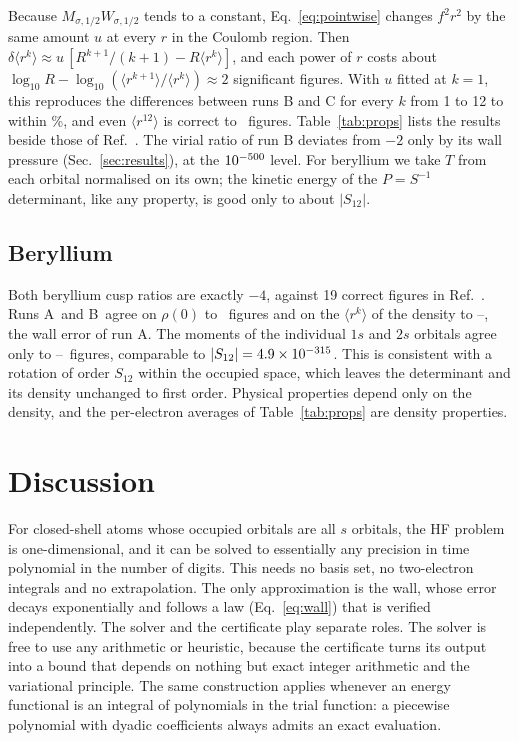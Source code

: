 \documentclass[aps,pra,reprint,superscriptaddress,amsmath,amssymb,longbibliography]{revtex4-2}
\begin{document}
Because $M_{\sigma,1/2}W_{\sigma,1/2}$ tends to a constant, Eq.~\eqref{eq:pointwise} changes $f^2r^2$ by the same amount $u$ at every $r$ in the Coulomb region. Then $\delta\langle r^k\rangle\approx u\,[R^{k+1}/(k+1)-R\langle r^k\rangle]$, and each power of $r$ costs about $\log_{10}R-\log_{10}(\langle r^{k+1}\rangle/\langle r^k\rangle)\approx2$ significant figures. With $u$ fitted at $k=1$, this reproduces the differences between runs B and C for every $k$ from 1 to 12 to within \UniPct\%, and even $\langle r^{12}\rangle$ is correct to \PropRtwelve\ figures. Table~\ref{tab:props} lists the results beside those of Ref.~\cite{Hatano2025}. The virial ratio of run B deviates from $-2$ only by its wall pressure (Sec.~\ref{sec:results}), at the $10^{-500}$ level. For beryllium we take $T$ from each orbital normalised on its own; the kinetic energy of the $P=S^{-1}$ determinant, like any property, is good only to about $|S_{12}|$.

\subsection{Beryllium}

Both beryllium cusp ratios are exactly $-4$, against 19 correct figures in Ref.~\cite{Hatano2025}. Runs A\BeRef\ and B\BeRef\ agree on $\rho(0)$ to \BeRho\ figures and on the $\langle r^k\rangle$ of the density to \BeDensMin--\BeDensMax, the wall error of run A\BeRef. The moments of the individual $1s$ and $2s$ orbitals agree only to \BeOrbMin--\BeOrbMax\ figures, comparable to $|S_{12}|=4.9\times10^{-315}$. This is consistent with a rotation of order $S_{12}$ within the occupied space, which leaves the determinant and its density unchanged to first order. Physical properties depend only on the density, and the per-electron averages of Table~\ref{tab:props} are density properties.

\section{Discussion}

For closed-shell atoms whose occupied orbitals are all $s$ orbitals, the HF problem is one-dimensional, and it can be solved to essentially any precision in time polynomial in the number of digits. This needs no basis set, no two-electron integrals and no extrapolation. The only approximation is the wall, whose error decays exponentially and follows a law (Eq.~\eqref{eq:wall}) that is verified independently. The solver and the certificate play separate roles. The solver is free to use any arithmetic or heuristic, because the certificate turns its output into a bound that depends on nothing but exact integer arithmetic and the variational principle. The same construction applies whenever an energy functional is an integral of polynomials in the trial function: a piecewise polynomial with dyadic coefficients always admits an exact evaluation.
\end{document}
